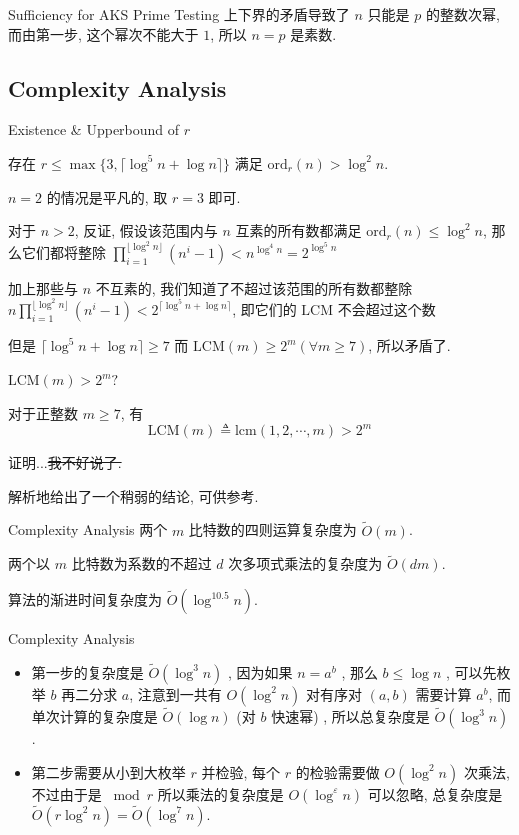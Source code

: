 \documentclass{beamer}
\def\le{\leqslant}
\def\ge{\geqslant}
\def\ord{\textrm{ord}}
\begin{document}
\begin{frame}{Sufficiency for AKS Prime Testing}
	上下界的矛盾导致了 $n$ 只能是 $p$ 的整数次幂, 而由第一步, 这个幂次不能大于 $1$, 所以 $n = p$ 是素数.
\end{frame}
\subsection{Complexity Analysis}
\begin{frame}{Existence \& Upperbound of $r$}
	\begin{lemma}
		存在 $r \le \max\{3, \lceil \log^5n + \log n \rceil\}$ 满足 $\ord_r(n) > \log^2n$.
	\end{lemma}
	$n = 2$ 的情况是平凡的, 取 $r = 3$ 即可.

	对于 $n > 2$, 反证, 假设该范围内与 $n$ 互素的所有数都满足 $\ord_r(n) \le \log^2n$, 那么它们都将整除 $\prod\limits_{i=1}^{\lfloor\log^2n\rfloor}(n^i-1) < n^{\log^4n} = 2^{\log^5n}$

	加上那些与 $n$ 不互素的, 我们知道了不超过该范围的所有数都整除 $n\prod\limits_{i=1}^{\lfloor\log^2n\rfloor}(n^i-1) < 2^{\lceil\log^5n+\log n \rceil}$,  即它们的 $\textrm{LCM}$ 不会超过这个数 

	但是 $\lceil \log^5n + \log n \rceil \ge 7$ 而 $\textrm{LCM}(m) \ge 2^m (\forall m \ge 7)$, 所以矛盾了.
\end{frame}
\begin{frame}{$\textrm{LCM}(m) > 2^m ?$}
	\begin{lemma}
		对于正整数 $m \ge 7$, 有$$\textrm{LCM}(m) \triangleq \textrm{lcm}(1, 2, \cdots, m) > 2^m$$
	\end{lemma}

	证明...\sout{我不好说了.}

	\cite{farhi2009identity} 解析地给出了一个稍弱的结论, 可供参考.
\end{frame}
\begin{frame}{Complexity Analysis}
	两个 $m$ 比特数的四则运算复杂度为 $\tilde O(m)$.

	两个以 $m$ 比特数为系数的不超过 $d$ 次多项式乘法的复杂度为 $\tilde O(dm)$.

	\begin{theorem}
		算法的渐进时间复杂度为 $\tilde O(\log^{10.5}n)$.
	\end{theorem}
\end{frame}
\begin{frame}{Complexity Analysis}
	\begin{itemize}
		\item 第一步的复杂度是 $\tilde O(\log^3n)$ , 因为如果 $n = a^b$ , 那么 $b \le \log n$ , 可以先枚举 $b$ 再二分求 $a$, 注意到一共有 $O(\log^2n)$ 对有序对 $(a, b)$ 需要计算 $a^b$, 而单次计算的复杂度是 $\tilde O(\log n)$ (对 $b$ 快速幂) , 所以总复杂度是 $\tilde O(\log^3n)$. \pause
		\item 第二步需要从小到大枚举 $r$ 并检验, 每个 $r$ 的检验需要做 $O(\log^2n)$ 次乘法, 不过由于是 $\bmod r$ 所以乘法的复杂度是 $O(\log^{\varepsilon} n)$ 可以忽略, 总复杂度是 $\tilde O(r\log^2n) = \tilde O(\log^7n)$.
	\end{itemize}
\end{frame}
\end{document}
